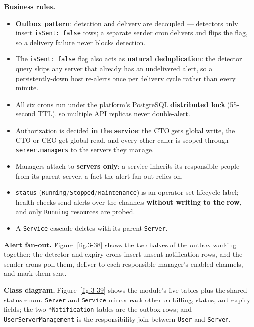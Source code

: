 \textbf{Business rules.}
\begin{itemize}
  \item \textbf{Outbox pattern}: detection and delivery are decoupled --- detectors only insert
    \texttt{isSent:\,false} rows; a separate sender cron delivers and flips the flag, so a
    delivery failure never blocks detection.
  \item The \texttt{isSent:\,false} flag also acts as \textbf{natural deduplication}: the detector query
    skips any server that already has an undelivered alert, so a persistently-down host
    re-alerts once per delivery cycle rather than every minute.
  \item All six crons run under the platform's PostgreSQL \textbf{distributed lock} (55-second
    TTL), so multiple API replicas never double-alert.
  \item Authorization is decided \textbf{in the service}: the CTO gets global write, the CTO or
    CEO get global read, and every other caller is scoped through \texttt{server.managers} to
    the servers they manage.
  \item Managers attach to \textbf{servers only}: a service inherits its responsible people
    from its parent server, a fact the alert fan-out relies on.
  \item \texttt{status} (\texttt{Running}/\texttt{Stopped}/\texttt{Maintenance}) is an
    operator-set lifecycle label; health checks send alerts over the channels \textbf{without
    writing to the row}, and only \texttt{Running} resources are probed.
  \item A \texttt{Service} cascade-deletes with its parent \texttt{Server}.
\end{itemize}


\textbf{Alert fan-out.} Figure~\ref{fig:3-38} shows the two halves of the outbox working
together: the detector and expiry crons insert unsent notification rows, and the sender crons poll them,
deliver to each responsible manager's enabled channels, and mark them sent.


\textbf{Class diagram.} Figure~\ref{fig:3-39} shows the module's five tables plus the shared
status enum. \texttt{Server} and \texttt{Service} mirror each other on billing, status, and
expiry fields; the two \texttt{*Notification} tables are the outbox rows; and
\texttt{UserServerManagement} is the responsibility join between \texttt{User} and
\texttt{Server}.

